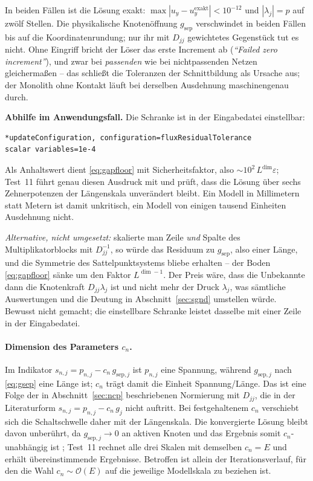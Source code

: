\documentclass[a4paper,11pt]{article}
\def\tilde#1{#1}%
\begin{document}
\noindent In beiden Fällen ist die Lösung exakt: $\max|u_y-u_y^{\text{exakt}}|<10^{-12}$ und
$|\lambda_j|=p$ auf zwölf Stellen. Die physikalische Knotenöffnung $g_{\text{sep}}$ verschwindet
in beiden Fällen bis auf die Koordinatenrundung; nur ihr mit $\tilde D_{jj}$ gewichtetes Gegenstück
tut es nicht. Ohne Eingriff bricht der Löser das erste Increment ab
(\emph{``Failed zero increment''}), und zwar bei \emph{passenden} wie bei nichtpassenden Netzen
gleichermaßen -- das schließt die Toleranzen der Schnittbildung als Ursache aus; der Monolith
ohne Kontakt läuft bei derselben Ausdehnung maschinengenau durch.

\medskip
\noindent\textbf{Abhilfe im Anwendungsfall.} Die Schranke ist in der Eingabedatei einstellbar:
\begin{lstlisting}[language=bash]
*updateConfiguration, configuration=fluxResidualTolerance
scalar variables=1e-4
\end{lstlisting}
Als Anhaltswert dient \eqref{eq:gapfloor} mit Sicherheitsfaktor, also
$\sim\!10^2\,L^{\dim}\varepsilon$; Test~11 führt genau diesen Ausdruck mit und prüft, dass die
Lösung über sechs Zehnerpotenzen der Längenskala unverändert bleibt. Ein Modell in Millimetern
statt Metern ist damit unkritisch, ein Modell von einigen tausend Einheiten Ausdehnung nicht.

\medskip
\noindent\emph{Alternative, nicht umgesetzt:} skalierte man Zeile \emph{und} Spalte des
Multiplikatorblocks mit $\tilde D_{jj}^{-1}$, so würde das Residuum zu $g_{\text{sep}}$, also einer
Länge, und die Symmetrie des Sattelpunktsystems bliebe erhalten -- der Boden \eqref{eq:gapfloor}
sänke um den Faktor $L^{\dim-1}$. Der Preis wäre, dass die Unbekannte dann die Knotenkraft
$\tilde D_{jj}\lambda_j$ ist und nicht mehr der Druck $\lambda_j$, was sämtliche Auswertungen und
die Deutung in Abschnitt~\ref{sec:sgnd} umstellen würde. Bewusst nicht gemacht; die einstellbare
Schranke leistet dasselbe mit einer Zeile in der Eingabedatei.

\paragraph{Dimension des Parameters $c_n$.}
Im Indikator $s_{n,j}=p_{n,j}-c_n\,g_{\text{sep},j}$ ist $p_{n,j}$ eine Spannung, während
$g_{\text{sep},j}$ nach \eqref{eq:gsep} eine Länge ist; $c_n$ trägt damit die Einheit
Spannung/Länge. Das ist eine Folge der in Abschnitt~\ref{sec:ncp} beschriebenen Normierung mit
$\tilde D_{jj}$, die in der Literaturform $s_{n,j}=p_{n,j}-c_n\,\tilde g_j$ nicht auftritt. Bei
festgehaltenem $c_n$ verschiebt sich die Schaltschwelle daher mit der Längenskala. Die konvergierte
Lösung bleibt davon unberührt, da $g_{\text{sep},j}\to0$ an aktiven Knoten und das Ergebnis somit
$c_n$-unabhängig ist \citep[Abschn.~3.5.2]{farah}; Test~11 rechnet alle drei Skalen mit demselben
$c_n=E$ und erhält übereinstimmende Ergebnisse. Betroffen ist allein der Iterationsverlauf, für
den die Wahl $c_n\sim\mathcal O(E)$ auf die jeweilige Modellskala zu beziehen ist.
\end{document}
